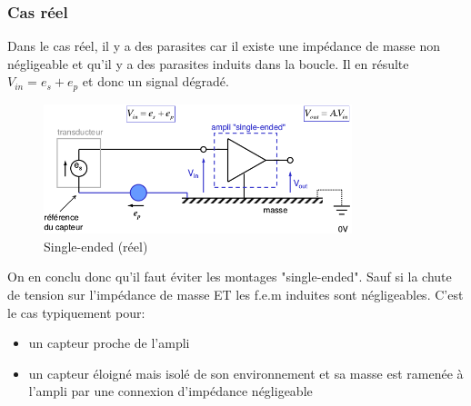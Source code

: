 \subsubsection{Cas réel}
Dans le cas réel, il y a des parasites car il existe une impédance de masse non négligeable et qu'il y a des parasites induits dans la boucle. Il en résulte \(V_{in} = e_s + e_p\) et donc un signal dégradé.
\begin{figure}[H]
	\centering 
	\includegraphics[width=0.8\textwidth,height=10\baselineskip,keepaspectratio]{ch3/image12} 
	\caption{Single-ended (réel)} 
\end{figure}
On en conclu donc qu'il faut éviter les montages "single-ended". Sauf si la chute de tension sur l'impédance de masse ET les f.e.m induites sont négligeables. C'est le cas typiquement pour:
\begin{itemize}
	\item un capteur proche de l'ampli
	\item un capteur éloigné mais isolé de son environnement et sa masse est ramenée à l'ampli par une connexion d'impédance négligeable
\end{itemize}

